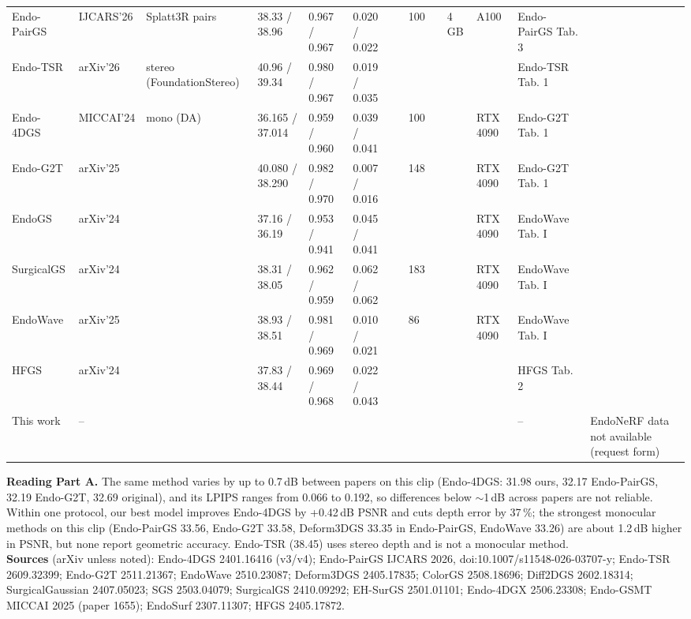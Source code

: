 \documentclass[9pt]{extarticle}
\begin{document}
\begin{longtable}{@{}p{4.2cm}p{1.15cm}p{2.1cm}p{2.2cm}p{2.0cm}p{2.0cm}p{1.35cm}p{0.85cm}p{1.15cm}p{1.0cm}p{1.35cm}p{2.3cm}p{3.6cm}@{}}
Endo-PairGS & IJCARS'26 & Splatt3R pairs & 38.33 / 38.96 & 0.967 / 0.967 & 0.020 / 0.022 &  & 100 &  & 4 GB & A100 & Endo-PairGS Tab. 3 &  \\
Endo-TSR & arXiv'26 & stereo (FoundationStereo) & 40.96 / 39.34 & 0.980 / 0.967 & 0.019 / 0.035 &  &  &  &  &  & Endo-TSR Tab. 1 &  \\
Endo-4DGS & MICCAI'24 & mono (DA) & 36.165 / 37.014 & 0.959 / 0.960 & 0.039 / 0.041 &  & 100 &  &  & RTX 4090 & Endo-G2T Tab. 1 &  \\
Endo-G2T & arXiv'25 &  & 40.080 / 38.290 & 0.982 / 0.970 & 0.007 / 0.016 &  & 148 &  &  & RTX 4090 & Endo-G2T Tab. 1 &  \\
EndoGS & arXiv'24 &  & 37.16 / 36.19 & 0.953 / 0.941 & 0.045 / 0.041 &  &  &  &  & RTX 4090 & EndoWave Tab. I &  \\
SurgicalGS & arXiv'24 &  & 38.31 / 38.05 & 0.962 / 0.959 & 0.062 / 0.062 &  & 183 &  &  & RTX 4090 & EndoWave Tab. I &  \\
EndoWave & arXiv'25 &  & 38.93 / 38.51 & 0.981 / 0.969 & 0.010 / 0.021 &  & 86 &  &  & RTX 4090 & EndoWave Tab. I &  \\
HFGS & arXiv'24 &  & 37.83 / 38.44 & 0.969 / 0.968 & 0.022 / 0.043 &  &  &  &  &  & HFGS Tab. 2 &  \\
This work & -- &  &  &  &  &  &  &  &  &  & -- & EndoNeRF data not available (request form) \\
\end{longtable}
\vspace{-4pt}
\noindent\textbf{Reading Part A.} The same method varies by up to 0.7\,dB between papers on this clip (Endo-4DGS: 31.98 ours, 32.17 Endo-PairGS, 32.19 Endo-G2T, 32.69 original), and its LPIPS ranges from 0.066 to 0.192, so differences below $\sim$1\,dB across papers are not reliable. Within one protocol, our best model improves Endo-4DGS by +0.42\,dB PSNR and cuts depth error by 37\,\%; the strongest monocular methods on this clip (Endo-PairGS 33.56, Endo-G2T 33.58, Deform3DGS 33.35 in Endo-PairGS, EndoWave 33.26) are about 1.2\,dB higher in PSNR, but none report geometric accuracy. Endo-TSR (38.45) uses stereo depth and is not a monocular method.\\[2pt]
\noindent\textbf{Sources} (arXiv unless noted): Endo-4DGS 2401.16416 (v3/v4); Endo-PairGS IJCARS 2026, doi:10.1007/s11548-026-03707-y; Endo-TSR 2609.32399; Endo-G2T 2511.21367; EndoWave 2510.23087; Deform3DGS 2405.17835; ColorGS 2508.18696; Diff2DGS 2602.18314; SurgicalGaussian 2407.05023; SGS 2503.04079; SurgicalGS 2410.09292; EH-SurGS 2501.01101; Endo-4DGX 2506.23308; Endo-GSMT MICCAI 2025 (paper 1655); EndoSurf 2307.11307; HFGS 2405.17872.
\end{document}
